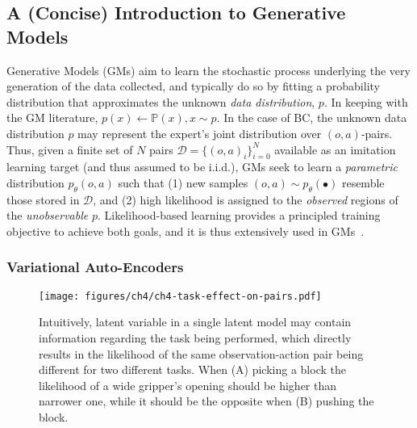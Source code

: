 \subsection{A (Concise) Introduction to Generative Models}
Generative Models (GMs) aim to learn the stochastic process underlying the very generation of the data collected, and typically do so by fitting a probability distribution that approximates the unknown \emph{data distribution}, \( p \).
In keeping with the GM literature, \( p(x) \leftarrow \mathbb P(x), x \sim p \).
In the case of BC, the unknown data distribution \( p \) may represent the expert's joint distribution over \( (o, a) \)-pairs.
Thus, given a finite set of \( N \) pairs \(\mathcal D = \{ (o,a)_i \}_{i=0}^N\) available as an imitation learning target (and thus assumed to be i.i.d.), GMs seek to learn a \emph{parametric} distribution \( p_\theta(o,a) \) such that (1) new samples \( (o,a) \sim p_\theta(\bullet) \) resemble those stored in \( \mathcal D \), and (2) high likelihood is assigned to the \emph{observed} regions of the \emph{unobservable} \( p \).
Likelihood-based learning provides a principled training objective to achieve both goals, and it is thus extensively used in GMs~\citep{prince2023understanding}.

\subsubsection{Variational Auto-Encoders}

\begin{figure}
    \centering
    \texttt{[image: figures/ch4/ch4-task-effect-on-pairs.pdf]}
    \caption{Intuitively, latent variable in a single latent model may contain information regarding the task being performed, which directly results in the likelihood of the same observation-action pair being different for two different tasks. When (A) picking a block the likelihood of a wide gripper's opening should be higher than narrower one, while it should be the opposite when (B) pushing the block.}
    \label{fig:ch4-task-effect-on-pairs}
\end{figure}

